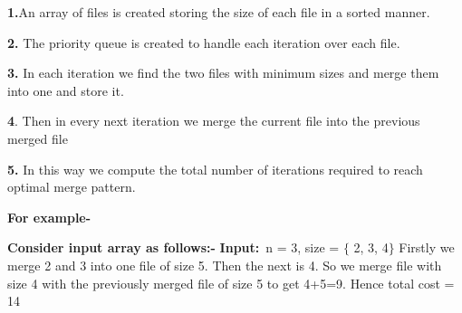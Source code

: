 \documentclass[10pt]{report}
\begin{document}
\begin{multicols}{2}
\vspace{\baselineskip}
\textbf{1.}An array of files is created storing the size of each file in a sorted manner.

\vspace{\baselineskip}
\textbf{2. }The priority queue is created to handle each iteration over each file.

\vspace{\baselineskip}
\textbf{3. }In each iteration we find the two files with minimum sizes and merge them into one and store it.

\vspace{\baselineskip}
\textbf{4}. Then in every next iteration we merge the current file into the previous merged file

\vspace{\baselineskip}
\textbf{5.} In this way we compute the total number of iterations required to reach optimal merge pattern.

\vspace{\baselineskip}

\vspace{\baselineskip}
\textbf{For example-}

\vspace{\baselineskip}
\textbf{Consider input array as follows:-}
\textbf{\textcolor[HTML]{40424E}{Input:}}\textcolor[HTML]{40424E}{ n = 3, size = $ \{ $ 2, 3, 4$ \} $ }
Firstly we merge 2 and 3 into one file of size 5. Then the next is 4. So we merge file with size 4 with the previously merged file of size 5 to get 4+5=9.
Hence total cost = 14

\vspace{\baselineskip}

\vspace{\baselineskip}

\vspace{\baselineskip}

\vspace{\baselineskip}

\vspace{\baselineskip}

\vspace{\baselineskip}

\vspace{\baselineskip}

\vspace{\baselineskip}

\vspace{\baselineskip}


\end{multicols}
\end{document}
